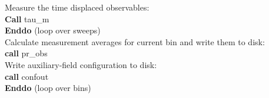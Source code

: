 \begin{mdframed}[frametitle={Basic structure of the auxiliary field QMC implementation (\path{Prog/main.f90}):}]
{\hspace*{2em} Measure the time displaced observables: \\
\hspace*{2em} \textbf{Call} tau\_m\\
\hspace*{1em} \textbf{Enddo} (loop over sweeps)\\
    
\hspace*{1em} Calculate measurement averages for current bin and write them to disk:\\
\hspace*{1em} \textbf{call} pr\_obs\\
\hspace*{1em} Write auxiliary-field configuration to disk: \\
\hspace*{1em} \textbf{call} confout\\
\textbf{Enddo} (loop over bins)\\
% 
}
\end{mdframed}
% 
% 
% 
% 
% 
% 
% 
%    
%       
%          
%                         
